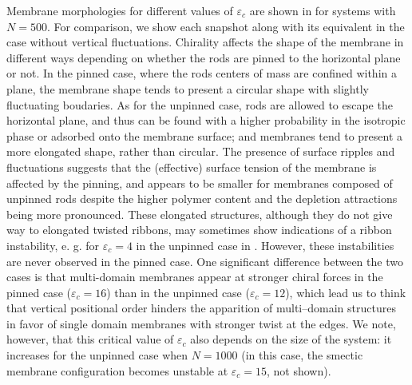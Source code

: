 Membrane morphologies for different values of $\varepsilon_c$ are shown in  for systems with $N=500$. For comparison, we show each snapshot along with its equivalent in the case without vertical fluctuations. Chirality affects the shape of the membrane in different ways depending on whether the rods are pinned to the horizontal plane or not. In the pinned case, where the rods centers of mass are confined within a plane, the membrane shape tends to present a circular shape with slightly fluctuating boudaries. As for the unpinned case, rods are allowed to escape the horizontal plane, and thus can be found with a higher probability in the isotropic phase or adsorbed onto the membrane surface; and membranes tend to present a more elongated shape, rather than circular. The presence of surface ripples and fluctuations suggests that the (effective) surface tension of the membrane is affected by the pinning, and appears to be smaller for membranes composed of unpinned rods despite the  higher polymer content and the depletion attractions being more pronounced.  These elongated structures, although they do not give way to elongated twisted ribbons, may sometimes show indications of a ribbon instability, e. g. for $\varepsilon_c=4$ in the unpinned case in . However, these instabilities are never observed in the pinned case. One significant difference between the two cases is that multi-domain membranes appear at stronger chiral forces in the pinned case ($\varepsilon_c=16$) than in the unpinned case ($\varepsilon_c=12$), which lead us to think that vertical positional order hinders the apparition of multi--domain structures in favor of single domain membranes with stronger twist at the edges. We note, however, that this critical value of $\varepsilon_c$ also depends on the size of the system: it increases for the unpinned case when $N=1000$ (in this case, the smectic membrane configuration becomes unstable at $\varepsilon_c=15$, not shown).

